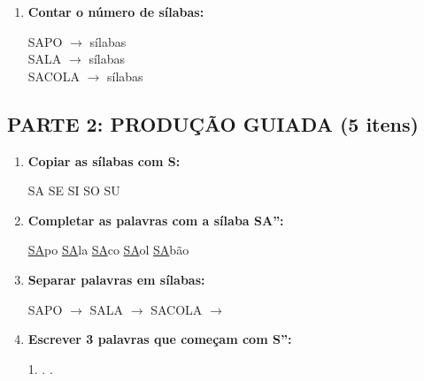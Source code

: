 \begin{exercicio}
\begin{enumerate}
  \item \textbf{Contar o número de sílabas:}
  \begin{center}
  SAPO $\rightarrow$ \underline{\hspace{1cm}} sílabas \\
  SALA $\rightarrow$ \underline{\hspace{1cm}} sílabas \\
  SACOLA $\rightarrow$ \underline{\hspace{1cm}} sílabas
  \end{center}
\end{enumerate}

\subsection*{PARTE 2: PRODUÇÃO GUIADA (5 itens)}

\begin{enumerate}[resume]
  \item \textbf{Copiar as sílabas com S:}
  \begin{center}
  SA \quad \underline{\hspace{1.5cm}} \quad SE \quad \underline{\hspace{1.5cm}} \quad SI \quad \underline{\hspace{1.5cm}} \quad SO \quad \underline{\hspace{1.5cm}} \quad SU \quad \underline{\hspace{1.5cm}}
  \end{center}

  \item \textbf{Completar as palavras com a sílaba SA'':}
  \begin{center}
  \underline{SA}po \quad \underline{SA}la \quad \underline{SA}co \quad \underline{SA}ol \quad \underline{SA}bão
  \end{center}

  \item \textbf{Separar palavras em sílabas:}
  \begin{center}
  SAPO $\rightarrow$ \underline{\hspace{1.5cm}} \quad SALA $\rightarrow$ \underline{\hspace{1.5cm}} \quad SACOLA $\rightarrow$ \underline{\hspace{1.5cm}}
  \end{center}

  \item \textbf{Escrever 3 palavras que começam com S'':}
  \begin{center}
  1. \underline{\hspace{3cm}} . \underline{\hspace{3cm}} . \underline{\hspace{3cm}}
  \end{center}


\end{enumerate}
\end{exercicio}
